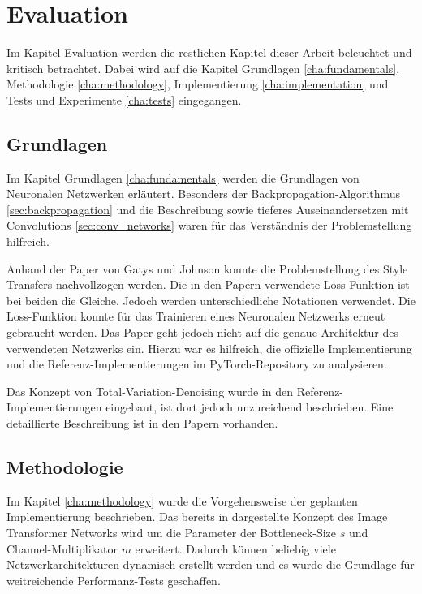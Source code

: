 \chapter{Evaluation}

Im Kapitel Evaluation werden die restlichen Kapitel dieser Arbeit beleuchtet und kritisch betrachtet. Dabei wird auf die Kapitel Grundlagen \ref{cha:fundamentals}, Methodologie \ref{cha:methodology}, Implementierung \ref{cha:implementation} und Tests und Experimente \ref{cha:tests} eingegangen.

\section{Grundlagen}

Im Kapitel Grundlagen \ref{cha:fundamentals} werden die Grundlagen von Neuronalen Netzwerken erläutert. Besonders der Backpropagation-Algorithmus \ref{sec:backpropagation} und die Beschreibung sowie tieferes Auseinandersetzen mit Convolutions \ref{sec:conv_networks} waren für das Verständnis der Problemstellung hilfreich.

Anhand der Paper von Gatys \cite{DBLP:journals/corr/GatysEB15a} und Johnson \cite{DBLP:journals/corr/JohnsonAL16} konnte die Problemstellung des Style Transfers nachvollzogen werden. Die in den Papern verwendete Loss-Funktion ist bei beiden die Gleiche. Jedoch werden unterschiedliche Notationen verwendet. Die Loss-Funktion konnte für das Trainieren eines Neuronalen Netzwerks erneut gebraucht werden. Das Paper \cite{DBLP:journals/corr/JohnsonAL16} geht jedoch nicht auf die genaue Architektur des verwendeten Netzwerks ein. Hierzu war es hilfreich, die offizielle Implementierung \cite{Johnson2016} und die Referenz-Implementierungen im PyTorch-Repository \cite{OnlineToturialNeuralStylePyTorch} zu analysieren.

Das Konzept von Total-Variation-Denoising wurde in den Referenz-Implementierungen eingebaut, ist dort jedoch unzureichend beschrieben. Eine detaillierte Beschreibung ist in den Papern \cite{RUDIN1992259, DBLP:journals/corr/EstrelaMS16} vorhanden.

\section{Methodologie}

Im Kapitel \ref{cha:methodology} wurde die Vorgehensweise der geplanten Implementierung beschrieben. Das bereits in \cite{DBLP:journals/corr/JohnsonAL16} dargestellte Konzept des Image Transformer Networks wird um die Parameter der Bottleneck-Size $ s $ und Channel-Multiplikator $ m $ erweitert. Dadurch können beliebig viele Netzwerkarchitekturen dynamisch erstellt werden und es wurde die Grundlage für weitreichende Performanz-Tests geschaffen.

